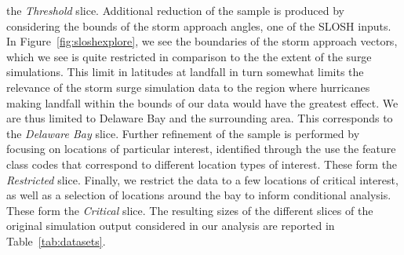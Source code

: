     the \emph{Threshold} slice.  Additional reduction of the sample is produced by
    considering the bounds of the storm approach angles, one of the SLOSH inputs.
    In Figure~\ref{fig:sloshexplore}, we see the boundaries of the storm approach
    vectors, which we see is quite restricted in comparison to the the extent of the 
    surge simulations.  This limit in latitudes at landfall in turn somewhat limits the
    relevance of the storm surge simulation data to the region where hurricanes making
    landfall within the bounds of our data would have the greatest effect.  We are
    thus limited to Delaware Bay and the
    surrounding area. This corresponds to the \emph{Delaware Bay} slice.  Further 
    refinement of the sample is performed by focusing on locations of particular 
    interest, identified through the use the feature class codes that correspond 
    to different location types of interest.  These form the \emph{Restricted} slice.
    Finally, we restrict the data to a few locations of critical interest, 
    as well as a selection of locations around the bay to inform conditional analysis.  
    These form the \emph{Critical} slice. The resulting sizes of the different 
    slices of the original simulation output considered in our analysis are
    reported in Table~\ref{tab:datasets}.


